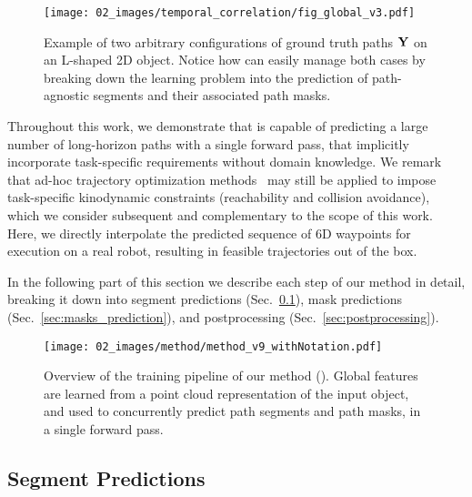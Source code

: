 \begin{figure}[!t]
    \centering
    \texttt{[image: 02\_images/temporal\_correlation/fig\_global\_v3.pdf]}
    \vspace{-8pt}
    \caption{Example of two arbitrary configurations of ground truth paths $\mathbf{Y}$ on an L-shaped 2D object.
    Notice how \ours can easily manage both cases by breaking down the learning problem into the prediction of path-agnostic segments and their associated path masks.
    }
    \label{fig:temporal_correlation}
    \vspace{-6pt}
\end{figure}

Throughout this work, we demonstrate that \ours is capable of predicting a large number of long-horizon paths with a single forward pass, that implicitly incorporate task-specific requirements without domain knowledge.
We remark that ad-hoc trajectory optimization methods~\cite{gleeson2022generating} may still be applied to impose task-specific kinodynamic constraints (\eg  reachability and collision avoidance), which we consider subsequent and complementary to the scope of this work. 
Here, we directly interpolate the predicted sequence of 6D waypoints for execution on a real robot, resulting in feasible trajectories out of the box.

In the following part of this section we describe each step of our method in detail, breaking it down into segment predictions (Sec.~\ref{sec:segments_prediction}), mask predictions (Sec.~\ref{sec:masks_prediction}), and postprocessing (Sec.~\ref{sec:postprocessing}).
%

\begin{figure*}[!t]
    \centering
    \texttt{[image: 02\_images/method/method\_v9\_withNotation.pdf]}
    \caption{Overview of the training pipeline of our method (\ours). Global features are learned from a point cloud representation of the input object, and used to concurrently predict path segments and path masks, in a single forward pass.
    }
    \label{fig:method}
    \vspace{-6pt}
\end{figure*}



\subsection{Segment Predictions}
\label{sec:segments_prediction}

